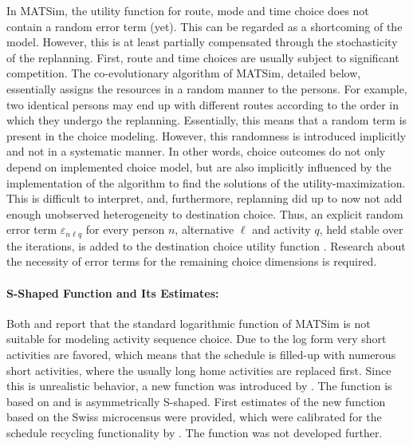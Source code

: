 In MATSim, the utility function for route, mode and time choice does not contain a random error term (yet). This can be regarded as a shortcoming of the model. However, this is at least partially compensated through the stochasticity of the replanning. First, route and time choices are usually subject to significant competition. The co-evolutionary algorithm of MATSim, detailed below, essentially assigns the resources in a random manner to the persons. For example, two identical persons may end up with different routes according to the order in which they undergo the replanning. Essentially, this means that a random term is present in the choice modeling. However, this randomness is introduced implicitly and not in a systematic manner. In other words, choice outcomes do not only depend on implemented choice model, but are also implicitly influenced by the implementation of the algorithm to find the solutions of the utility-maximization. This is difficult to interpret, and, furthermore, replanning did up to now not add enough unobserved heterogeneity to destination choice. Thus, an explicit random error term $\varepsilon_{n\ell q}$ for every person $n$, alternative $\ell$ and activity $q$, held stable over the iterations, is added to the destination choice utility function \citep[][]{Horni_PhDThesis_2013}. Research about the necessity of error terms for the remaining choice dimensions is required.

\paragraph{S-Shaped Function and Its Estimates:}
Both \citet[][p.127f]{Feil_PhDThesis_2010} and \citet[][p.32]{MATSim_Userguide_2014} report that the standard logarithmic function of MATSim is not suitable for modeling activity sequence choice. Due to the log form very short activities are favored, which means that the schedule is filled-up with numerous short activities, where the usually long home activities are replaced first. Since this is unrealistic behavior, a new function was introduced by \citet[][p.129ff]{Feil_PhDThesis_2010}. The function is based on \citet[][]{Joh_PhDThesis_2004} and is asymmetrically S-shaped. First estimates of the new function based on the Swiss microcensus were provided, which were calibrated for the schedule recycling functionality by \citet[][p.152f]{Feil_PhDThesis_2010}. The function was not developed further.

